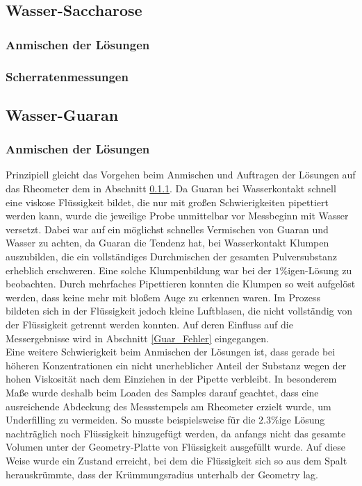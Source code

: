 \documentclass[11pt,a4paper,oneside]{scrartcl}
\begin{document}
\subsection{Wasser-Saccharose}
\subsubsection{Anmischen der Lösungen}\label{H2O-Suc_Anmischen}
\subsubsection{Scherratenmessungen}
\subsection{Wasser-Guaran}
\subsubsection{Anmischen der Lösungen}\label{anmischen_guaran}
Prinzipiell gleicht das Vorgehen beim Anmischen und Auftragen der Lösungen auf das Rheometer dem in Abschnitt \ref{H2O-Suc_Anmischen}. Da Guaran bei Wasserkontakt schnell eine viskose Flüssigkeit bildet, die nur mit großen Schwierigkeiten pipettiert werden kann, wurde die jeweilige Probe unmittelbar vor Messbeginn mit Wasser versetzt. Dabei war auf ein möglichst schnelles Vermischen von Guaran und Wasser zu achten, da Guaran die Tendenz hat, bei Wasserkontakt Klumpen auszubilden, die ein vollständiges Durchmischen der gesamten Pulversubstanz erheblich erschweren. Eine solche Klumpenbildung war bei der $1\%$igen-Lösung zu beobachten. Durch mehrfaches Pipettieren konnten die Klumpen so weit aufgelöst werden, dass keine mehr mit bloßem Auge zu erkennen waren. Im Prozess bildeten sich in der Flüssigkeit jedoch kleine Luftblasen, die nicht vollständig von der Flüssigkeit getrennt werden konnten. Auf deren Einfluss auf die Messergebnisse wird in Abschnitt \ref{Guar_Fehler} eingegangen.\\
Eine weitere Schwierigkeit beim Anmischen der Lösungen ist, dass gerade bei höheren Konzentrationen ein nicht unerheblicher Anteil der Substanz wegen der hohen Viskosität nach dem Einziehen in der Pipette verbleibt. In besonderem Maße wurde deshalb beim Loaden des Samples darauf geachtet, dass eine ausreichende Abdeckung des Messstempels am Rheometer erzielt wurde, um Underfilling zu vermeiden. So musste beispielsweise für die $2.3\%$ige Lösung nachträglich noch Flüssigkeit hinzugefügt werden, da anfangs nicht das gesamte Volumen unter der Geometry-Platte von Flüssigkeit ausgefüllt wurde. Auf diese Weise wurde ein Zustand erreicht, bei dem die Flüssigkeit sich so aus dem Spalt herauskrümmte, dass der Krümmungsradius unterhalb der Geometry lag.
\end{document}
